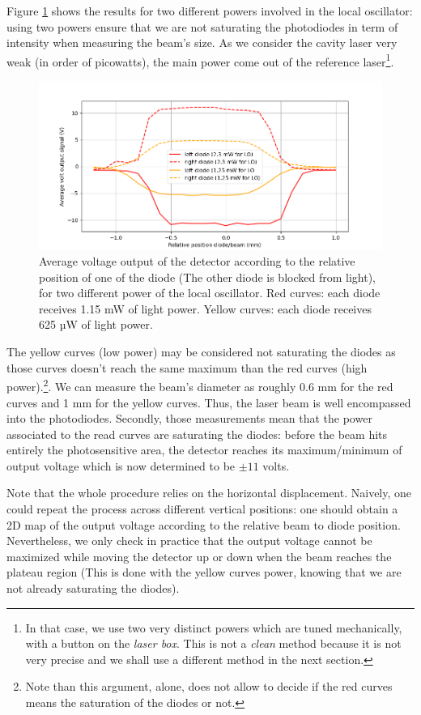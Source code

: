 \documentclass[11pt]{report}
\begin{document}
Figure \ref{fig:diode-size-plot} shows the results for two different powers involved in the local oscillator: using two powers ensure that we are not saturating the photodiodes in term of intensity when measuring the beam's size. As we consider the cavity laser very weak (in order of picowatts), the main power come out of the reference laser\footnote{In that case, we use two very distinct powers which are tuned mechanically, with a button on the \textit{laser box}. This is not a \textit{clean} method because it is not very precise and we shall use a different method in the next section.}.

\begin{figure}[h!]
\centering
\includegraphics[width=\textwidth]{diode-size-plot}
\caption{Average voltage output of the detector according to the relative position of one of the diode (The other diode is blocked from light), for two different power of the local oscillator. Red curves: each diode receives 1.15 mW of light power. Yellow curves: each diode receives 625 µW of light power.}
\label{fig:diode-size-plot}
\end{figure}

The yellow curves (low power) may be considered not saturating the diodes as those curves doesn't reach the same maximum than the red curves (high power).\footnote{Note than this argument, alone, does not allow to decide if the red curves means the saturation of the diodes or not.}. We can measure the beam's diameter as roughly 0.6 mm for the red curves and 1 mm for the yellow curves. Thus, the laser beam is well encompassed into the photodiodes. Secondly, those measurements mean that the power associated to the read curves are saturating the diodes: before the beam hits entirely the photosensitive area, the detector reaches its maximum/minimum of output voltage which is now determined to be $\pm11$ volts.

Note that the whole procedure relies on the horizontal displacement. Naively, one could repeat the process across different vertical positions: one should obtain a 2D map of the output voltage according to the relative beam to diode position. Nevertheless, we only check in practice that the output voltage cannot be maximized while moving the detector up or down when the beam reaches the plateau region (This is done with the yellow curves power, knowing that we are not already saturating the diodes).
\end{document}
